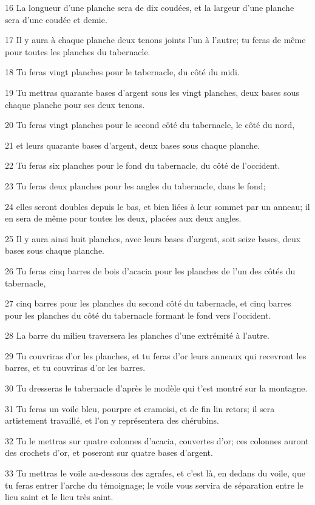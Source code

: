 \par 16 La longueur d'une planche sera de dix coudées, et la largeur d'une planche sera d'une coudée et demie.
\par 17 Il y aura à chaque planche deux tenons joints l'un à l'autre; tu feras de même pour toutes les planches du tabernacle.
\par 18 Tu feras vingt planches pour le tabernacle, du côté du midi.
\par 19 Tu mettras quarante bases d'argent sous les vingt planches, deux bases sous chaque planche pour ses deux tenons.
\par 20 Tu feras vingt planches pour le second côté du tabernacle, le côté du nord,
\par 21 et leurs quarante bases d'argent, deux bases sous chaque planche.
\par 22 Tu feras six planches pour le fond du tabernacle, du côté de l'occident.
\par 23 Tu feras deux planches pour les angles du tabernacle, dans le fond;
\par 24 elles seront doubles depuis le bas, et bien liées à leur sommet par un anneau; il en sera de même pour toutes les deux, placées aux deux angles.
\par 25 Il y aura ainsi huit planches, avec leurs bases d'argent, soit seize bases, deux bases sous chaque planche.
\par 26 Tu feras cinq barres de bois d'acacia pour les planches de l'un des côtés du tabernacle,
\par 27 cinq barres pour les planches du second côté du tabernacle, et cinq barres pour les planches du côté du tabernacle formant le fond vers l'occident.
\par 28 La barre du milieu traversera les planches d'une extrémité à l'autre.
\par 29 Tu couvriras d'or les planches, et tu feras d'or leurs anneaux qui recevront les barres, et tu couvriras d'or les barres.
\par 30 Tu dresseras le tabernacle d'après le modèle qui t'est montré sur la montagne.
\par 31 Tu feras un voile bleu, pourpre et cramoisi, et de fin lin retors; il sera artistement travaillé, et l'on y représentera des chérubins.
\par 32 Tu le mettras sur quatre colonnes d'acacia, couvertes d'or; ces colonnes auront des crochets d'or, et poseront sur quatre bases d'argent.
\par 33 Tu mettras le voile au-dessous des agrafes, et c'est là, en dedans du voile, que tu feras entrer l'arche du témoignage; le voile vous servira de séparation entre le lieu saint et le lieu très saint.
